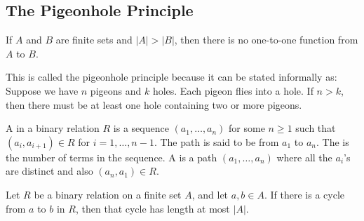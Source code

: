 \subsection{The Pigeonhole Principle}

\begin{thm2}
If $A$ and $B$ are finite sets and $|A| > |B|$, then there is no one-to-one function from $A$ to $B$.
\end{thm2}

\begin{discussion}
This is called the pigeonhole principle because it can be stated informally  as: Suppose we have $n$ pigeons and $k$ holes. Each pigeon flies into a hole. If $n > k$, then there must be at least one hole containing two or more pigeons.
\end{discussion}

\begin{defn}
A  in a binary relation $R$ is a sequence $(a_1, \ldots, a_n)$ for some $n \geq 1$ such that $(a_i, a_{i+1}) \in R$ for $i = 1,\ldots,n-1$. The path is said to be from $a_1$ to $a_n$. The  is the number of terms in the sequence. A  is a path $(a_1, \ldots, a_n)$ where all the $a_i$'s are distinct and also $(a_n, a_1) \in R$.
\end{defn}

\begin{stmt2}
Let $R$ be a binary relation on a finite set $A$, and let $a, b \in A$. If there is a cycle from $a$ to $b$ in $R$, then that cycle has length at most $|A|$.
\end{stmt2}


